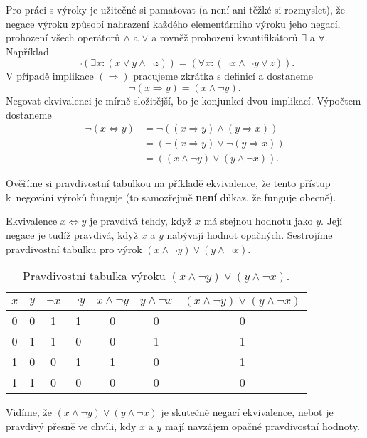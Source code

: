 Pro práci s výroky je užitečné si pamatovat (a není ani těžké si rozmyslet), že
negace výroku způsobí nahrazení každého elementárního výroku jeho negací,
prohození všech operátorů $ \wedge $ a $ \vee $ a rovněž prohození
kvantifikátorů $ \exists $ a $ \forall $. Například
\[
 \neg ( \exists x:(x \vee y \wedge \neg z)) = ( \forall x:(\neg x \wedge \neg y
 \vee z)).
\]
V případě implikace $( \Rightarrow )$ pracujeme zkrátka s definicí a dostaneme
\[
 \neg (x \Rightarrow y) = (x \wedge \neg y).
\]
Negovat ekvivalenci je mírně složitější, bo je konjunkcí dvou implikací.
Výpočtem dostaneme
\begin{equation*}
 \begin{split} 
  \neg (x \Leftrightarrow y) &= \neg ((x \Rightarrow y) \wedge (y \Rightarrow
  x))\\
                             &= (\neg (x \Rightarrow y) \vee \neg (y \Rightarrow
  x))\\
                             &= ((x \wedge \neg y) \vee (y \wedge \neg x)).
 \end{split}
\end{equation*}

Ověříme si pravdivostní tabulkou na příkladě ekvivalence, že tento 
přístup k~negování výroků funguje (to samozřejmě \textbf{není} důkaz, že funguje
obecně).

Ekvivalence $x \Leftrightarrow y$ je pravdivá tehdy, když $x$ má stejnou hodnotu
jako $y$. Její negace je tudíž pravdivá, když $x$ a $y$ nabývají hodnot
opačných. Sestrojíme pravdivostní tabulku pro výrok $(x \wedge \neg y) \vee (y
\wedge \neg x)$.

\begin{table}[h]
 \centering
 \begin{tabular}{c|c|c|c|c|c|c}
  $x$ & $y$ & $\neg x$ & $\neg y$ & $x \wedge \neg y$ & $y \wedge \neg x$ & $(x
  \wedge \neg y) \vee (y \wedge \neg x)$\\
  \toprule
  0 & 0 & 1 & 1 & 0 & 0 & 0\\
  0 & 1 & 1 & 0 & 0 & 1 & 1\\
  1 & 0 & 0 & 1 & 1 & 0 & 1\\
  1 & 1 & 0 & 0 & 0 & 0 & 0
 \end{tabular}
 \caption{Pravdivostní tabulka výroku $(x \wedge \neg y) \vee (y \wedge \neg
 x)$.}
 \label{table:negace-ekvivalence}
\end{table}

Vidíme, že $(x \wedge \neg y) \vee (y \wedge \neg x)$ je skutečně negací
ekvivalence, neboť je pravdivý přesně ve chvíli, kdy $x$ a $y$ mají navzájem
opačné pravdivostní hodnoty.
